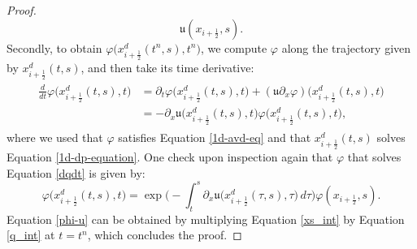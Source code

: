 \documentclass[preprint,12pt]{elsarticle}
\begin{document}
\begin{linenumbers}
\begin{proof}
{\begin{equation}
	\mathfrak{u}(x_{i+\frac{1}{2}},s).
\end{equation}
Secondly, to obtain $\varphi\big(x_{i+\frac{1}{2}}^d(t^n,s),t^n\big)$, we compute $\varphi$ along the trajectory given by $x_{i+\frac{1}{2}}^d(t,s)$, and then take its time derivative:
\begin{align}
	\label{dqdt}
	\begin{split}
		\frac{d}{dt}\varphi\big( x_{i+\frac{1}{2}}^d(t,s),t\big) &= 
		{\partial_t}\varphi\big( x_{i+\frac{1}{2}}^d(t,s),t\big)+
		(\mathfrak{u}{\partial_x } 
		\varphi)\big(x_{i+\frac{1}{2}}^d(t,s),t\big) \\
		&= -{\partial_x}{\mathfrak{u}}\big( x_{i+\frac{1}{2}}^d(t,s),t\big) \varphi \big(x_{i+\frac{1}{2}}^d(t,s),t\big),
	\end{split}
\end{align}
where we used that $\varphi$ satisfies Equation \eqref{1d-avd-eq} and that $x_{i+\frac{1}{2}}^d(t,s)$
solves Equation \eqref{1d-dp-equation}.
One check upon inspection again that $\varphi$ that solves Equation \eqref{dqdt} is given by:
\begin{equation}
	\label{q_int}
	\varphi\big( x_{i+\frac{1}{2}}^d(t,s),t\big) = 
	\exp{\bigg(-\int_{t}^{s} {\partial_x}{\mathfrak{u}}\big( x_{i+\frac{1}{2}}^d(\tau,s),\tau\big)  \,d\tau \bigg)}
	\varphi(x_{i+\frac{1}{2}},s).
\end{equation}
Equation \eqref{phi-u} can be obtained by multiplying Equation \eqref{xs_int} by Equation \eqref{q_int} at $t=t^n$, which concludes the proof.}
\end{proof}

\end{linenumbers}
   
  






\end{document}
